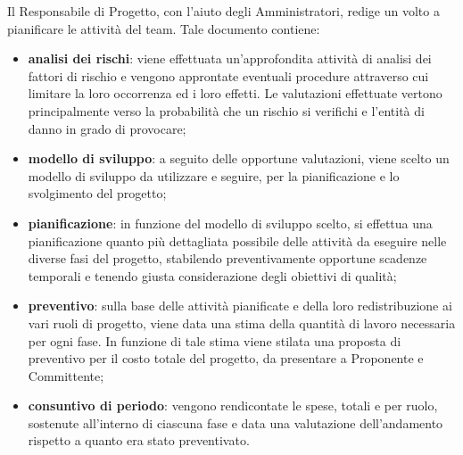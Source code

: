    Il Responsabile di Progetto, con l'aiuto degli Amministratori, redige un \PdP{} volto a pianificare le attività del team. Tale documento contiene:
    \begin{itemize}
       		\item{\textbf{analisi dei rischi}: viene effettuata un'approfondita attività di analisi dei fattori di rischio e vengono approntate eventuali procedure attraverso cui limitare la loro occorrenza ed i loro effetti.
       		Le valutazioni effettuate vertono principalmente verso la probabilità che un rischio si verifichi e l'entità di danno in grado di provocare;}
       		\item{\textbf{modello di sviluppo}: a seguito delle opportune valutazioni, viene scelto un modello di sviluppo da utilizzare e seguire, per la pianificazione e lo svolgimento del progetto;}
       		\item{\textbf{pianificazione}: in funzione del modello di sviluppo scelto, si effettua una pianificazione quanto più dettagliata possibile delle attività da eseguire nelle diverse fasi del progetto, stabilendo preventivamente opportune scadenze temporali e tenendo giusta considerazione degli obiettivi di qualità;}
       		\item{\textbf{preventivo}: sulla base delle attività pianificate e della loro redistribuzione ai vari ruoli di progetto, viene data una stima della quantità di lavoro necessaria per ogni fase. In funzione di tale stima viene stilata una proposta di preventivo per il costo totale del progetto, da presentare a Proponente e Committente;}
       		\item{\textbf{consuntivo di periodo}: vengono rendicontate le spese, totali e per ruolo, sostenute all'interno di ciascuna fase e data una valutazione dell'andamento rispetto a quanto era stato preventivato.}
    \end{itemize}
    
